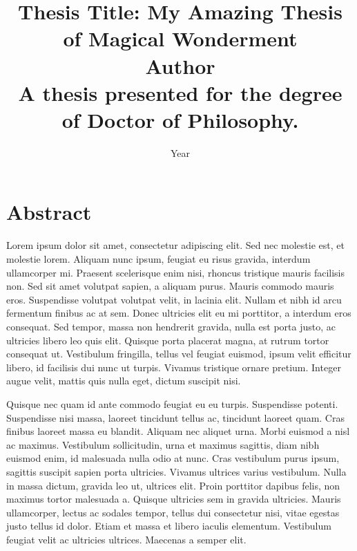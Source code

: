 
\title{ \huge{\textbf{Thesis Title: My Amazing Thesis of Magical Wonderment}} \\[1.2cm]
\vspace{2.2cm}
\Large{\textbf{Author}} \\[1.2cm]
\vspace{2cm}
\large{A thesis presented for the degree of Doctor of Philosophy.} \\
\vspace{2.5cm}
}

\date{Year}

\maketitle

\cleardoublepage

\chapter*{Abstract}
Lorem ipsum dolor sit amet, consectetur adipiscing elit. Sed nec molestie est, et molestie lorem. Aliquam nunc ipsum, feugiat eu risus gravida, interdum ullamcorper mi. Praesent scelerisque enim nisi, rhoncus tristique mauris facilisis non. Sed sit amet volutpat sapien, a aliquam purus. Mauris commodo mauris eros. Suspendisse volutpat volutpat velit, in lacinia elit. Nullam et nibh id arcu fermentum finibus ac at sem. Donec ultricies elit eu mi porttitor, a interdum eros consequat. Sed tempor, massa non hendrerit gravida, nulla est porta justo, ac ultricies libero leo quis elit. Quisque porta placerat magna, at rutrum tortor consequat ut. Vestibulum fringilla, tellus vel feugiat euismod, ipsum velit efficitur libero, id facilisis dui nunc ut turpis. Vivamus tristique ornare pretium. Integer augue velit, mattis quis nulla eget, dictum suscipit nisi.

Quisque nec quam id ante commodo feugiat eu eu turpis. Suspendisse potenti. Suspendisse nisi massa, laoreet tincidunt tellus ac, tincidunt laoreet quam. Cras finibus laoreet massa eu blandit. Aliquam nec aliquet urna. Morbi euismod a nisl ac maximus. Vestibulum sollicitudin, urna et maximus sagittis, diam nibh euismod enim, id malesuada nulla odio at nunc. Cras vestibulum purus ipsum, sagittis suscipit sapien porta ultricies. Vivamus ultrices varius vestibulum. Nulla in massa dictum, gravida leo ut, ultrices elit. Proin porttitor dapibus felis, non maximus tortor malesuada a. Quisque ultricies sem in gravida ultricies. Mauris ullamcorper, lectus ac sodales tempor, tellus dui consectetur nisi, vitae egestas justo tellus id dolor. Etiam et massa et libero iaculis elementum. Vestibulum feugiat velit ac ultricies ultrices. Maecenas a semper elit.

